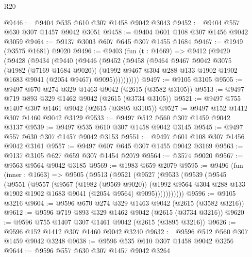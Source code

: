 \begin{lexlean}{R20}
\begin{coremodule}
@9446 := @9404 @535 @610 @307 @1458 @9042 @3043
@9452 := @9404 @557 @630 @307 @1457 @9042 @3051
@9458 := @9404 @601 @108 @307 @1456 @9042 @3059
@9464 := @9137 @3003 @607 @645 @307 @1455 @1684
@9467 := @1949 (@3575 @1681) @9020
@9496 := @9403
    (fun (t : @1669) =>
    @9412
      (@9420
        (@9428
          (@9434
            (@9440
              (@9446
                (@9452
                  (@9458
                    (@9464
                      @9467
                      @9042
                      @3075
                      (@1982 (@7169 @1684 @9020))
                      (@1992
                        @9467
                        @304
                        @288
                        @133
                        @1902
                        @1902
                        @1683
                        @9041
                        (@2054 @9467)
                        @9095))))))))))
@9497 := @9105 @3105
@9505 := @9497 @670 @274 @329 @1463 @9042 (@2615 (@3582 @3105))
@9513 := @9497 @719 @893 @329 @1462 @9042 (@2615 (@3734 @3105))
@9521 := @9497 @755 @1407 @307 @1461 @9042 (@2615 (@3895 @3105))
@9527 := @9497 @152 @1412 @307 @1460 @9042 @3129
@9533 := @9497 @512 @560 @307 @1459 @9042 @3137
@9539 := @9497 @535 @610 @307 @1458 @9042 @3145
@9545 := @9497 @557 @630 @307 @1457 @9042 @3153
@9551 := @9497 @601 @108 @307 @1456 @9042 @3161
@9557 := @9497 @607 @645 @307 @1455 @9042 @3169
@9563 := @9137 @3105 @627 @659 @307 @1454 @2079
@9564 := @3574 @9020
@9567 := @9563 @9564 @9042 @3185
@9569 := @1983 @659 @2079
@9595 := @9496
    (fun (inner : @1663) =>
    @9505
      (@9513
        (@9521
          (@9527
            (@9533
              (@9539
                (@9545
                  (@9551
                    (@9557
                      (@9567
                        (@1982 (@9569 @9020))
                        (@1992
                          @9564
                          @304
                          @288
                          @133
                          @1902
                          @1902
                          @1683
                          @9041
                          (@2054 @9564)
                          @9095)))))))))))
@9596 := @9105 @3216
@9604 := @9596 @670 @274 @329 @1463 @9042 (@2615 (@3582 @3216))
@9612 := @9596 @719 @893 @329 @1462 @9042 (@2615 (@3734 @3216))
@9620 := @9596 @755 @1407 @307 @1461 @9042 (@2615 (@3895 @3216))
@9626 := @9596 @152 @1412 @307 @1460 @9042 @3240
@9632 := @9596 @512 @560 @307 @1459 @9042 @3248
@9638 := @9596 @535 @610 @307 @1458 @9042 @3256
@9644 := @9596 @557 @630 @307 @1457 @9042 @3264

\end{coremodule}
\end{lexlean}
